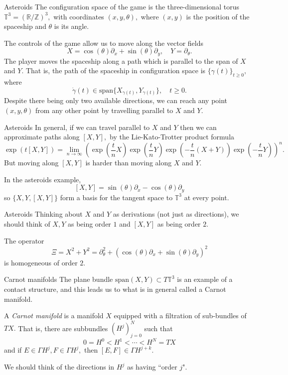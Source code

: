 \documentclass{beamer}
\numberwithin{equation}{section}
\theoremstyle{plain}
\theoremstyle{plain}
\theoremstyle{definition}
\theoremstyle{plain}
\theoremstyle{plain}
\theoremstyle{definition}
\newcommand{\Rl}{\mathbb{R}}
\newcommand{\Itgr}{\mathbb{Z}}
\newcommand{\Circ}{\mathbb{T}}
\begin{document}
\begin{frame}{Asteroids}
  The configuration space of the game is the three-dimensional torus $\Circ^3 = (\Rl/\Itgr)^3,$ with coordinates $(x,y,\theta),$ where $(x,y)$ is the position of the spaceship and $\theta$ is its angle.

  The controls of the game allow us to move along the vector fields
  \[
    X = \cos(\theta)\partial_x+\sin(\theta)\partial_y,\quad Y = \partial_\theta.
  \]
  \pause
  The player moves the spaceship along a path which is parallel to the span of $X$ and $Y.$ That is, the path of the spaceship in configuration space is $\{\gamma(t)\}_{t\geq 0},$ where
  \[
    \dot{\gamma}(t) \in \mathrm{span}\{X_{\gamma(t)},Y_{\gamma(t)}\},\quad t\geq 0.
  \]
  \pause
  Despite there being only two available directions, we can reach any point $(x,y,\theta)$ from any other point by travelling parallel to $X$ and $Y.$
\end{frame}


\begin{frame}{Asteroids}
  In general, if we can travel parallel to $X$ and $Y$ then we can approximate paths along $[X,Y],$ by the Lie-Kato-Trotter product formula
  \[
    \exp(t[X,Y]) = \lim_{n\to\infty} (\exp(\frac{t}{n}X)\exp(\frac{t}{n}Y)\exp(-\frac{t}{n}(X+Y))\exp(-\frac{t}{n}Y))^n.
  \]
  But moving along $[X,Y]$ is harder than moving along $X$ and $Y.$

  In the asteroids example,
  \[
    [X,Y] = \sin(\theta)\partial_x-\cos(\theta)\partial_y
  \]
  so $\{X,Y,[X,Y]\}$ form a basis for the tangent space to $\Circ^3$ at every point.
\end{frame}

\begin{frame}{Asteroids}
  Thinking about $X$ and $Y$ as derivations (not just as directions), we should think of $X,Y$ as being order $1$ and $[X,Y]$ as being order $2.$

  The operator
  \[
    \Xi = X^2+Y^2 = \partial_\theta^2+(\cos(\theta)\partial_x+\sin(\theta)\partial_y)^2
  \]
  is homogeneous of order $2.$
\end{frame}

\begin{frame}{Carnot manifolds}
  The plane bundle $\mathrm{span}(X,Y)\subset T\Circ^3$ is an example of a contact structure, and this leads us to what is in general called a Carnot manifold.
  \begin{definition}
    A \emph{Carnot manifold} is a manifold $X$ equipped with a filtration of sub-bundles of $TX.$ That is, there are subbundles $(H^j)_{j=0}^N$ such that
    \[
      0 = H^0 < H^1 < \cdots < H^N = TX
    \]
    and if $E\in \Gamma H^j, F\in \Gamma H^j,$ then $[E,F] \in \Gamma H^{j+k}.$
  \end{definition}
  We should think of the directions in $H^j$ as having ``order $j$".
\end{frame}
\end{document}
